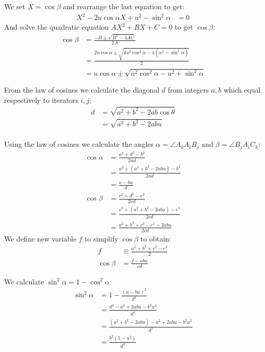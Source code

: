 \documentclass[11pt]{article}
\begin{document}
We set $X = \cos\beta$ and rearrange the last equation to get:
\begin{align}
X^2 - 2u\cos\alpha X + u^2 - \sin^2\alpha &= 0
\end{align}
And solve the quadratic equation $AX^2 + BX + C = 0$ to get $\cos\beta$:
\begin{align}
\cos\beta &= \frac{-B \pm \sqrt{B^2 - 4AC}}{2A}\nonumber\\
 &= \frac{2u\cos\alpha \pm 
 \sqrt{4u^2\cos^2\alpha - 4(u^2 -\sin^2\alpha)}}{2}\nonumber\\
 &= u\cos\alpha \pm \sqrt{u^2\cos^2\alpha - u^2 + \sin^2\alpha} \label{eq:cosbeta}
\end{align}


From the law of cosines we calculate the diagonal $d$ from integers $a,b$ which equal respectively to
iterators $i,j$:
\begin{align}
d &= \sqrt{a^2 + b^2 - 2ab\cos\theta} \nonumber\\
 &= \sqrt{a^2 + b^2 - 2abu} \nonumber\\
\end{align}

Using the law of cosines we calculate the angles $\alpha =\angle{A_0A_iB_j}$ 
and $\beta =\angle{B_jA_iC_k}$:
\begin{align}
\cos\alpha &= \frac{a^2 + d^2 - b^2}{2ad} \nonumber\\
 &= \frac{a^2 + (a^2 + b^2 - 2abu) - b^2}{2ad}\nonumber \\
 &= \frac{a - bu}{d}\\
%
\cos\beta &= \frac{c^2 + d^2 - e^2}{2cd}\nonumber\\
 &= \frac{c^2 + (a^2 + b^2 - 2abu) - e^2}{2cd}\nonumber\\
 &= \frac{a^2 + b^2 + c^2 - e^2 - 2abu}{2cd}
\end{align}
We define new variable $f$ to simplify $\cos\beta$ to obtain:
\begin{align}
f &\equiv \frac{a^2 + b^2 + c^2 - e^2}{2} \\
\cos\beta &= \frac{f - abu}{cd}
\end{align}

We calculate $\sin^2\alpha = 1 - \cos^2\alpha$:
\begin{align}
\sin^2\alpha &= 1 - \frac{(a - bu)^2}{d^2}\nonumber\\
 &=\frac{d^2 - a^2 + 2abu - b^2u^2}{d^2}\nonumber\\
 &=\frac{(a^2 + b^2 - 2abu) - a^2 + 2abu - b^2u^2}{d^2}\nonumber\\
 &=\frac{b^2(1-u^2)}{d^2}
\end{align}
\end{document}
